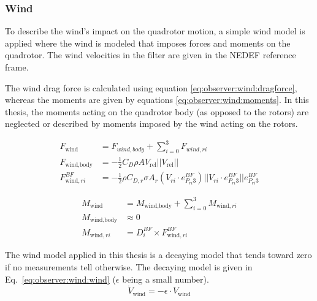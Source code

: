 \subsubsection{Wind}
    To describe the wind's impact on the quadrotor motion,
    a simple wind model is applied where the wind is modeled
    that imposes forces and moments on the quadrotor.
    The wind velocities in the filter are given in the NEDEF reference frame.

    The wind drag force is calculated using equation \eqref{eq:observer:wind:dragforce},
    whereas the moments are given by equations \eqref{eq:observer:wind:moments}.
    In this thesis, the moments acting on the quadrotor body (as opposed to the rotors)
    are neglected or described by moments imposed by the wind acting on the rotors.

    \begin{subequations}
    \label{eq:observer:wind:dragforce}
        \begin{align}
            F_{\text{wind}} &= F_{wind,body} + \sum_{i=0}^{3} F_{wind,ri} \\
%
            F_{\text{wind,body}} &= -\frac{1}{2} C_{D} \rho A V_{\text{rel}} ||V_{\text{rel}}|| \\
%
            F^{BF}_{\text{wind},ri} &= -\frac{1}{2} \rho C_{D,r} \sigma A_{r} (V_{ri} \cdot e_{P_{ri}3}^{BF}) ||V_{ri} \cdot e_{P_{ri}3}^{BF}|| e_{P_{ri}3}^{BF}
        \end{align}
    \end{subequations}

    \begin{subequations}
    \label{eq:observer:wind:moments}
        \begin{align}
            M_{\text{wind}} &= M_{\text{wind,body}} + \sum_{i=0}^{3}M_{\text{wind},ri} \\
%
            M_{\text{wind,body}} &\approx 0 \\ %
%
            M_{\text{wind},ri} &= D_{i}^{BF} \times F^{BF}_{\text{wind},ri}
        \end{align}
    \end{subequations}

    The wind model applied in this thesis is a decaying model that tends toward zero if no measurements tell otherwise.
    The decaying model is given in Eq.~\eqref{eq:observer:wind:wind} ($\epsilon$ being a small number).
    \begin{equation}
        \label{eq:observer:wind:wind}
        \dot{V}_{\text{wind}} = -\epsilon \cdot V_{\text{wind}}
    \end{equation}


